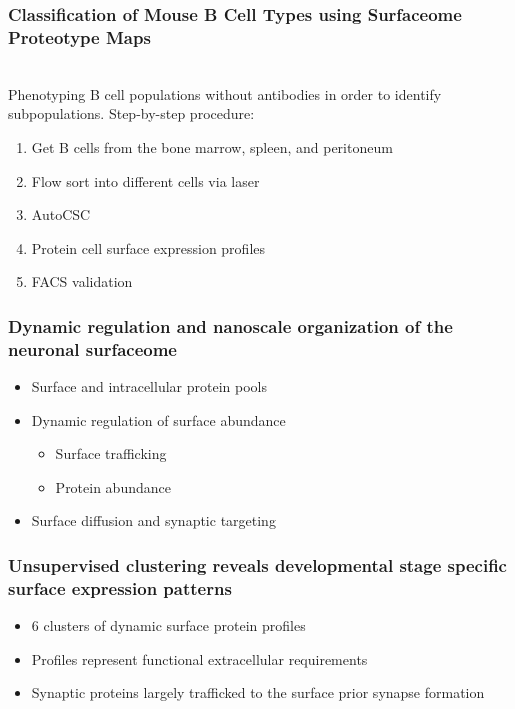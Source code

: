 \begin{itemize}
\begin{itemize}
\subsubsection{Classification of Mouse B Cell Types using Surfaceome Proteotype Maps}
\\Phenotyping B cell populations without antibodies in order to identify subpopulations. Step-by-step procedure:
\begin{enumerate}
    \item Get B cells from the bone marrow, spleen, and peritoneum
    \item Flow sort into different cells via laser
    \item AutoCSC
    \item Protein cell surface expression profiles
    \item FACS validation
\end{enumerate}

\subsubsection{Dynamic regulation and nanoscale organization of the neuronal surfaceome}
\begin{itemize}
    \item Surface and intracellular protein pools
    \item Dynamic regulation of surface abundance
    \begin{itemize}
        \item Surface trafficking
        \item Protein abundance
        
    \end{itemize}
    \item Surface diffusion and synaptic targeting
\end{itemize}
\subsubsection{Unsupervised clustering reveals developmental stage specific surface expression patterns}
\begin{itemize}
    \item 6 clusters of dynamic surface protein profiles
    \item Profiles represent functional extracellular requirements
    \item Synaptic proteins largely trafficked to the surface prior synapse formation
\end{itemize}

\end{itemize}
\end{itemize}
